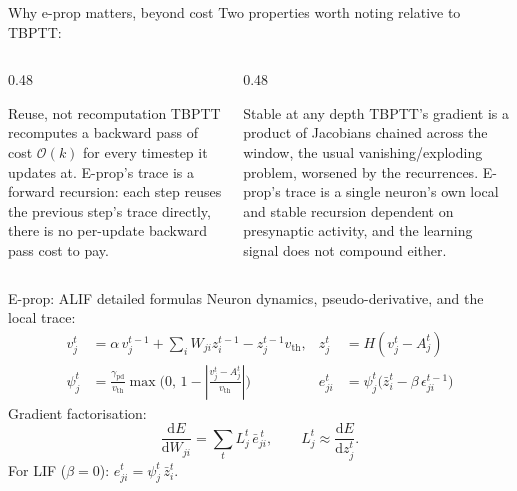 \documentclass[aspectratio=169,11pt]{beamer}
\begin{document}
\begin{frame}{Why e-prop matters, beyond cost}
  Two properties worth noting relative to TBPTT:
  \vfill
  \begin{columns}[T]
    \begin{column}{0.48\textwidth}
      \begin{block}{Reuse, not recomputation}
        TBPTT recomputes a backward pass of cost $\mathcal{O}(k)$ for every
        timestep it updates at. E-prop's trace is a forward recursion: each
        step reuses the previous step's trace directly, there is no per-update
        backward pass cost to pay.
      \end{block}
    \end{column}
    \begin{column}{0.48\textwidth}
      \begin{block}{Stable at any depth}
        TBPTT's gradient is a product of Jacobians chained across the
        window, the usual vanishing/exploding problem, worsened by the recurrences. E-prop's trace is a single neuron's own local
        and stable recursion dependent on presynaptic activity, and the learning signal does not compound either.
      \end{block}
    \end{column}
  \end{columns}
\end{frame}
\begin{frame}{E-prop: ALIF detailed formulas}
  Neuron dynamics, pseudo-derivative, and the local trace:
  \begin{align*}
    v^t_j &= \alpha\, v^{t-1}_j + \textstyle\sum_i W_{ji} z^{t-1}_i
             - z^{t-1}_j v_{\mathrm{th}},
      & z^t_j &= H(v^t_j - A^t_j)\\
    \psi^t_j &= \tfrac{\gamma_{\mathrm{pd}}}{v_{\mathrm{th}}}
      \max\!\big(0,\,1 - |\tfrac{v^t_j - A^t_j}{v_{\mathrm{th}}}|\big)
      & e^t_{ji} &= \psi^t_j\big(\bar{z}^t_i - \beta\,\epsilon^{t-1}_{ji}\big)
  \end{align*}
  Gradient factorisation:
  \[
    \frac{\mathrm{d}E}{\mathrm{d}W_{ji}} = \sum_t L^t_j\, \bar{e}^{\,t}_{ji},
    \qquad L^t_j \approx \frac{\mathrm{d}E}{\mathrm{d}z^t_j}.
  \]
  For LIF ($\beta=0$): $e^t_{ji} = \psi^t_j\,\bar{z}^t_i$.
\end{frame}
\end{document}
